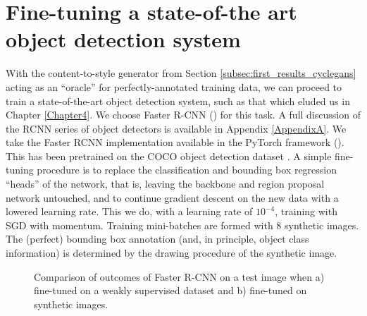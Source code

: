 \section{Fine-tuning a state-of-the art object detection system}
\label{sec:fine_tuning_rcnn}

With the content-to-style generator from Section \ref{subsec:first_results_cyclegans} acting as an ``oracle'' for perfectly-annotated training data, we can proceed to train a state-of-the-art object detection system, such as that which eluded us in Chapter \ref{Chapter4}. We choose Faster R-CNN (\cite{girshick2015fast}) for this task. A full discussion of the RCNN series of object detectors is available in Appendix \ref{AppendixA}. We take the Faster RCNN implementation available in the PyTorch framework (\cite{paszke2017automatic}). This has been pretrained on the COCO object detection dataset \cite{lin2014microsoft}. A simple fine-tuning procedure is to replace the classification and bounding box regression ``heads'' of the network, that is, leaving the backbone and region proposal network untouched, and to continue gradient descent on the new data with a lowered learning rate. This we do, with a learning rate of $10^{-4}$, training with SGD with momentum. Training mini-batches are formed with $8$ synthetic images. The (perfect) bounding box annotation (and, in principle, object class information) is determined by the drawing procedure of the synthetic image.

\begin{figure}[h]%
    \centering
    \qquad
    \caption{Comparison of outcomes of Faster R-CNN on a test image when a) fine-tuned on a weakly supervised dataset and b) fine-tuned on synthetic images.}%
    \label{fig:faster_rcnn}%
\end{figure}

